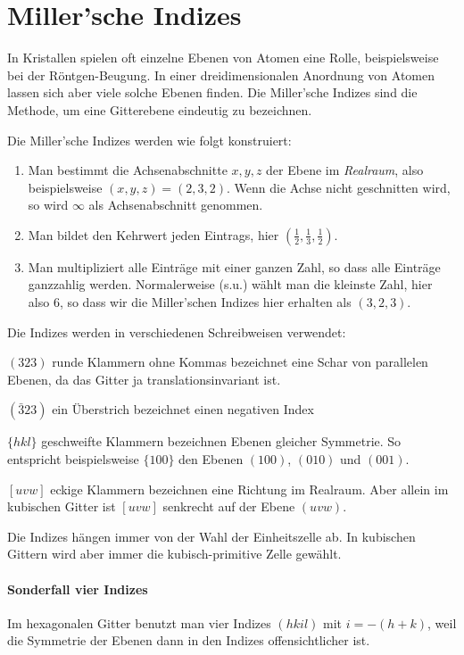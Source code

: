 \section{Miller'sche Indizes}

In Kristallen spielen oft einzelne Ebenen von Atomen eine Rolle, beispielsweise bei der Röntgen-Beugung. In einer dreidimensionalen Anordnung von Atomen lassen sich aber viele solche Ebenen finden. Die Miller'sche Indizes sind die Methode, um eine Gitterebene eindeutig zu bezeichnen.

Die Miller'sche Indizes werden wie folgt konstruiert:
\begin{enumerate} \setlength{\itemsep}{0pt}
\item Man bestimmt die Achsenabschnitte $x,y,z$ der Ebene im \emph{Realraum}, also beispielsweise $(x,y,z) = (2,3,2)$. Wenn die Achse nicht geschnitten wird, so wird $\infty$ als Achsenabschnitt genommen.
\item Man bildet den Kehrwert jeden Eintrags, hier $(\frac{1}{2},\frac{1}{3}, \frac{1}{2})$.
\item  Man multipliziert alle Einträge mit einer ganzen Zahl, so dass alle Einträge ganzzahlig werden. Normalerweise (s.u.) wählt man die kleinste Zahl, hier also  $6$, so dass wir die Miller'schen Indizes hier erhalten als $(3,2,3)$.
\end{enumerate}
Die Indizes werden in verschiedenen Schreibweisen verwendet:
\begin{description} \setlength{\itemsep}{0pt}
\item $(323)$ runde Klammern ohne  Kommas bezeichnet eine  Schar von parallelen Ebenen, da das Gitter ja translationsinvariant ist.
\item $(\bar{3}23)$ ein Überstrich bezeichnet einen negativen Index
\item $\{hkl\}$ geschweifte Klammern bezeichnen Ebenen gleicher Symmetrie. So entspricht beispielsweise  $\{100\}$ den Ebenen $(100)$, $(010)$ und $(001)$.
\item $[uvw]$ eckige Klammern bezeichnen eine Richtung im Realraum. Aber allein im kubischen Gitter ist $[uvw]$ senkrecht auf der Ebene $(uvw)$.
\end{description}
Die Indizes hängen immer von der Wahl der Einheitszelle ab. In kubischen Gittern wird aber immer die kubisch-primitive Zelle gewählt.

\paragraph{Sonderfall vier Indizes} Im hexagonalen Gitter benutzt man vier Indizes $(hkil)$ mit $i = - (h + k)$, weil die Symmetrie der Ebenen  dann in den Indizes offensichtlicher ist.

